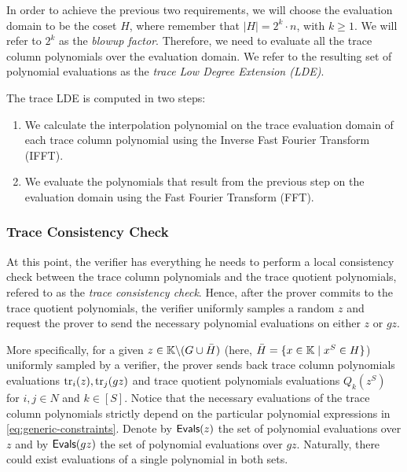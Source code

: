 In order to achieve the previous two requirements, we will choose the evaluation domain to be the coset $H$, where remember that $|H| = 2^k \cdot n$, with $k \geq 1$. We will refer to $2^k$ as the \textit{blowup factor}. Therefore, we need to evaluate all the trace column polynomials over the evaluation domain. We refer to the resulting set of polynomial evaluations as the \textit{trace Low Degree Extension (LDE)}.

The trace LDE is computed in two steps:
\begin{enumerate}
	\item We calculate the interpolation polynomial on the trace evaluation domain of each trace column polynomial using the Inverse Fast Fourier Transform (IFFT). 
	\item We evaluate the polynomials that result from the previous step on the evaluation domain using the Fast Fourier Transform (FFT).
\end{enumerate}





\subsubsection*{Trace Consistency Check}\label{sec:trace-consistency-check}

At this point, the verifier has everything he needs to perform a local consistency check between the trace column polynomials and the trace quotient polynomials, refered to as the \textit{trace consistency check}. Hence, after the prover commits to the trace quotient polynomials, 
the verifier uniformly samples a random $z$ and request the prover to send the necessary polynomial evaluations on either $z$ or $gz$. 

More specifically, for a given $z \in \mathbb{K} \backslash (G \cup \bar{H})$ (here, $\bar{H} = \{x \in \mathbb{K} \mid x^S \in H\}$) uniformly sampled by a verifier, the prover sends back trace column polynomials evaluations $\text{tr}_i(z), \text{tr}_j(gz)$ and trace quotient polynomials evaluations $Q_k(z^S)$ for $i,j \in N$ and $k \in [S]$. Notice that the necessary evaluations of the trace column polynomials strictly depend on the particular polynomial expressions in \eqref{eq:generic-constraints}. Denote by $\textsf{Evals}(z)$ the set of polynomial evaluations over $z$ and by $\textsf{Evals}(gz)$ the set of polynomial evaluations over $gz$. Naturally, there could exist evaluations of a single polynomial in both sets.

